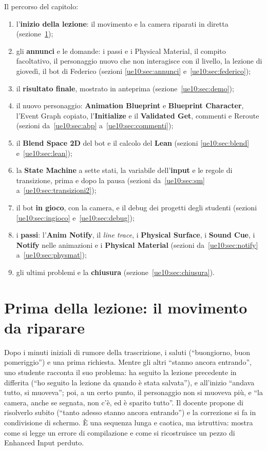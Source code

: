 Il percorso del capitolo:
\begin{enumerate}
  \item l'\textbf{inizio della lezione}: il movimento e la camera riparati in diretta
        (sezione~\ref{ue10:sec:riparazione});
  \item gli \textbf{annunci} e le domande: i passi e i Physical Material, il compito
        facoltativo, il personaggio nuovo che non interagisce con il livello, la lezione
        di giovedì, il bot di Federico (sezioni \ref{ue10:sec:annunci}
        e~\ref{ue10:sec:federico});
  \item il \textbf{risultato finale}, mostrato in anteprima
        (sezione~\ref{ue10:sec:demo});
  \item il nuovo personaggio: \textbf{Animation Blueprint} e \textbf{Blueprint
        Character}, l'Event Graph copiato, l'\textbf{Initialize} e il \textbf{Validated
        Get}, commenti e Reroute (sezioni da~\ref{ue10:sec:abp}
        a~\ref{ue10:sec:commenti});
  \item il \textbf{Blend Space 2D} del bot e il calcolo del \textbf{Lean} (sezioni
        \ref{ue10:sec:blend} e~\ref{ue10:sec:lean});
  \item la \textbf{State Machine} a sette stati, la variabile dell'\textbf{input} e le
        regole di transizione, prima e dopo la pausa (sezioni da~\ref{ue10:sec:sm}
        a~\ref{ue10:sec:transizioni2});
  \item il bot \textbf{in gioco}, con la camera, e il debug dei progetti degli studenti
        (sezioni \ref{ue10:sec:ingioco} e~\ref{ue10:sec:debug});
  \item i \textbf{passi}: l'\textbf{Anim Notify}, il \emph{line trace}, i
        \textbf{Physical Surface}, i \textbf{Sound Cue}, i \textbf{Notify} nelle
        animazioni e i \textbf{Physical Material} (sezioni da~\ref{ue10:sec:notify}
        a~\ref{ue10:sec:physmat});
  \item gli ultimi problemi e la \textbf{chiusura}
        (sezione~\ref{ue10:sec:chiusura}).
\end{enumerate}

\section{Prima della lezione: il movimento da riparare}
\label{ue10:sec:riparazione}

Dopo i minuti iniziali di rumore della trascrizione, i saluti (``buongiorno, buon
pomeriggio'') e una prima richiesta. Mentre gli altri ``stanno ancora entrando'', uno
studente racconta il suo problema: ha seguito la lezione precedente in differita (``ho
seguito la lezione da quando è stata salvata''), e all'inizio ``andava tutto, si
muoveva''; poi, a un certo punto, il personaggio non si muoveva più, e ``la camera,
anche se segnata, non c'è, ed è sparito tutto''. Il docente propone di risolverlo subito
(``tanto adesso stanno ancora entrando'') e la correzione si fa in condivisione di
schermo. È una sequenza lunga e caotica, ma istruttiva: mostra come si legge un errore di
compilazione e come si ricostruisce un pezzo di Enhanced Input perduto.


